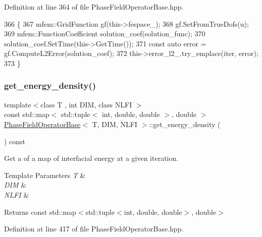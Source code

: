 Definition at line 364 of file Phase\+Field\+Operator\+Base.\+hpp.


\begin{DoxyCode}
366                                                                    \{
367   mfem::GridFunction gf(this->fespace\_);
368   gf.SetFromTrueDofs(u);
369   mfem::FunctionCoefficient solution\_coef(solution\_func);
370   solution\_coef.SetTime(this->GetTime());
371   \textcolor{keyword}{const} \textcolor{keyword}{auto} error = gf.ComputeL2Error(solution\_coef);
372   this->error\_l2\_.try\_emplace(iter, error);
373 \}
\end{DoxyCode}
\mbox{\label{classPhaseFieldOperatorBase_a8428da5d747f60f7ccbd79c879ca8d25}} 
\subsubsection{\texorpdfstring{get\+\_\+energy\+\_\+density()}{get\_energy\_density()}}
{\footnotesize\ttfamily template$<$class T , int D\+IM, class N\+L\+FI $>$ \\
const std\+::map$<$ std\+::tuple$<$ int, double, double $>$, double $>$ \hyperlink{classPhaseFieldOperatorBase}{Phase\+Field\+Operator\+Base}$<$ T, D\+IM, N\+L\+FI $>$\+::get\+\_\+energy\+\_\+density (\begin{DoxyParamCaption}{ }\end{DoxyParamCaption}) const\hspace{0.3cm}{\ttfamily [inherited]}}



Get a of a map of interfacial energy at a given iteration. 


\begin{DoxyTemplParams}{Template Parameters}
{\em T} & \\
\hline
{\em D\+IM} & \\
\hline
{\em N\+L\+FI} & \\
\hline
\end{DoxyTemplParams}
\begin{DoxyReturn}{Returns}
const std\+::map$<$std\+::tuple$<$int, double, double$>$, double$>$ 
\end{DoxyReturn}


Definition at line 417 of file Phase\+Field\+Operator\+Base.\+hpp.


